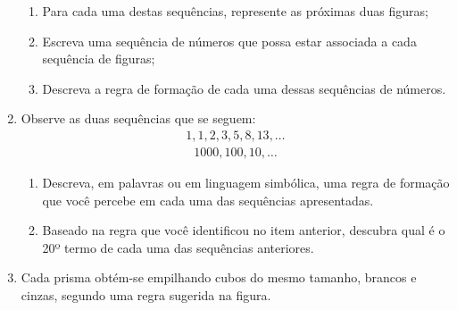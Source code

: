 \begin{enumerate}
\begin{enumerate}
\item {} 
Para cada uma destas sequências, represente as próximas duas figuras;

\item {} 
Escreva uma sequência de números que possa estar associada a cada sequência de figuras;

\item {} 
Descreva a regra de formação de cada uma dessas sequências de números.

\end{enumerate}

\clearpage

\item Observe as duas sequências que se seguem:
\begin{equation*}
\begin{split}1, 1, 2, 3, 5, 8, 13, \dots\end{split}
\end{equation*}\begin{equation*}
\begin{split}1000, 100, 10, \dots\end{split}
\end{equation*}\begin{enumerate}
\item {} 
Descreva, em palavras ou em linguagem simbólica, uma regra de formação que você percebe em cada uma das sequências apresentadas.

\item {} 
Baseado na regra que você identificou no item anterior, descubra qual é o 20º termo de cada uma das sequências anteriores.

\end{enumerate}

\item Cada prisma obtém-se empilhando cubos do mesmo tamanho, brancos e cinzas, segundo uma regra sugerida na figura.
\label{\detokenize{AF106-E1:fig-prismas}}

\begin{figure}[H]
\centering


\end{figure}
\end{enumerate}

